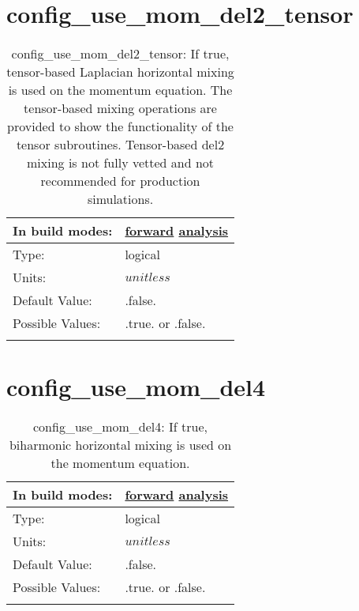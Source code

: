 \section[config\_use\_mom\_del2\_tensor]{config\_use\_mom\_del2\_tensor}
\label{sec:nm_sec_config_use_mom_del2_tensor}
\begin{center}
\begin{longtable}{| p{2.0in} || p{4.0in} |}
    \hline
    In build modes: & \hyperref[subsec:forward_nm_tab_hmix_del2_tensor]{forward} \hyperref[subsec:analysis_nm_tab_hmix_del2_tensor]{analysis} \\
    \hline
    Type: & logical \\
    \hline
    Units: & $unitless$ \\
    \hline
    Default Value: & .false. \\
    \hline
    Possible Values: & .true. or .false. \\
    \hline
    \caption{config\_use\_mom\_del2\_tensor: If true, tensor-based Laplacian horizontal mixing is used on the momentum equation.  The tensor-based mixing operations are provided to show the functionality of the tensor subroutines.  Tensor-based del2 mixing is not fully vetted and not recommended for production simulations.}
\end{longtable}
\end{center}
\section[config\_use\_mom\_del4]{config\_use\_mom\_del4}
\label{sec:nm_sec_config_use_mom_del4}
\begin{center}
\begin{longtable}{| p{2.0in} || p{4.0in} |}
    \hline
    In build modes: & \hyperref[subsec:forward_nm_tab_hmix_del4]{forward} \hyperref[subsec:analysis_nm_tab_hmix_del4]{analysis} \\
    \hline
    Type: & logical \\
    \hline
    Units: & $unitless$ \\
    \hline
    Default Value: & .false. \\
    \hline
    Possible Values: & .true. or .false. \\
    \hline
    \caption{config\_use\_mom\_del4: If true, biharmonic horizontal mixing is used on the momentum equation.}
\end{longtable}
\end{center}
